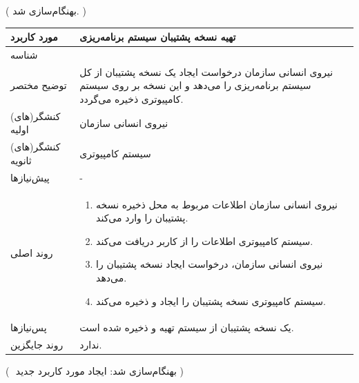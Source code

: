({\color{red} بهنگام‌سازی شد. })
\begin{table}[H]
	\centering
	\begin{tabular}{|p{3cm}|p{10cm}|}
		\hline
		مورد کاربرد & تهیه نسخه پشتیبان سیستم برنامه‌ریزی  \\
		\hline
		شناسه & 
		\stepcounter{usecase_ID}
		\arabic{usecase_ID} \\
		\hline
		توضیح مختصر &  نیروی انسانی سازمان  درخواست ایجاد یک نسخه پشتیبان از کل سیستم برنامه‌ریزی را می‌دهد و این نسخه بر روی سیستم کامپیوتری ذخیره می‌گردد. \\
		\hline
		کنشگر(های) اولیه & نیروی انسانی سازمان \\
		\hline
		کنشگر(های) ثانویه & سیستم کامپیوتری \\
		\hline
		پیش‌نیازها & - \\
		\hline
		
		روند اصلی &
		\begin{enumerate}[topsep=0cm,leftmargin=0.5cm]
			\item نیروی انسانی سازمان اطلاعات مربوط به محل ذخیره نسخه پشتیبان را وارد می‌کند. 
			\item سیستم کامپیوتری اطلاعات را از کاربر دریافت می‌کند.
			\item نیروی انسانی سازمان، درخواست ایجاد نسخه پشتیبان را می‌دهد.
			\item سیستم کامپیوتری نسخه پشتیبان را ایجاد و ذخیره می‌کند.
		\end{enumerate} \\
		
		\hline
		پس‌نیازها & یک نسخه پشتیبان از سیستم تهیه و ذخیره شده است. \\
		\hline
		روند جایگزین & ندارد. \\
		\hline
	\end{tabular}
\end{table}
\newpage
({\color{red} ‌ بهنگام‌سازی شد: ایجاد مورد کاربرد جدید })
